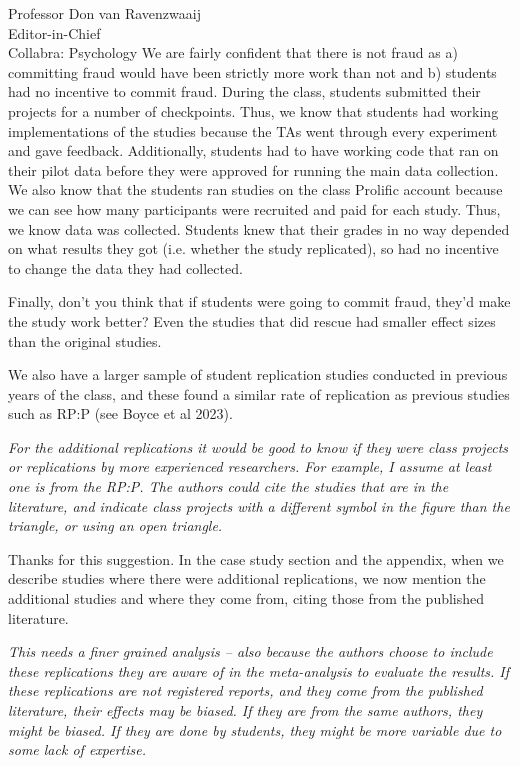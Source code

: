 \documentclass{stanfordletter}
\newcommand{\theysaid}[1]{\begin{leftbar} \noindent 
		\textsl{ #1}\end{leftbar}}
\begin{document}
\begin{letter}{Professor Don van Ravenzwaaij \\ Editor-in-Chief \\ Collabra: Psychology }
		We are fairly confident that there is not fraud as a) committing fraud would have been strictly more work than not and b) students had no incentive to commit fraud. During the class, students submitted their projects for a number of checkpoints. Thus, we know that students had working implementations of the studies because the TAs went through every experiment and gave feedback. Additionally, students had to have working code that ran on their pilot data before they were approved for running the main data collection. We also know that the students ran studies on the class Prolific account because we can see how many participants were recruited and paid for each study. Thus, we know data was collected. Students knew that their grades in no way depended on what results they got (i.e. whether the study replicated), so had no incentive to change the data they had collected. 
		
		Finally, don't you think that if students were going to commit fraud, they'd make the study work better? Even the studies that did rescue had smaller effect sizes than the original studies. 
		
		We also have a larger sample of student replication studies conducted in previous years of the class, and these found a similar rate of replication as previous studies such as RP:P (see Boyce et al 2023). 
		
		\theysaid{For the additional replications it would be good to know if they were class projects or replications by more experienced researchers. For example, I assume at least one is from the RP:P. The authors could cite the studies that are in the literature, and indicate class projects with a different symbol in the figure than the triangle, or using an open triangle. }
		
		Thanks for this suggestion. In the case study section and the appendix, when we describe studies where there were additional replications, we now mention the additional studies and where they come from, citing those from the published literature. 
		
		
		\theysaid{This needs a finer grained analysis – also because the authors choose to include these replications they are aware of in the meta-analysis to evaluate the results. If these replications are not registered reports, and they come from the published literature, their effects may be biased. If they are from the same authors, they might be biased. If they are done by students, they might be more variable due to some lack of expertise.}
		

\end{letter}
\end{document}

